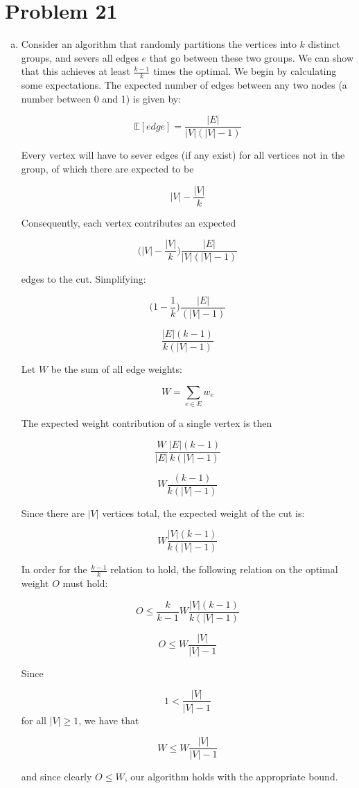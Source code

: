 \documentclass{article}[12pt]
\begin{document}
\section{Problem 21}
\begin{enumerate}[(a)]
\item Consider an algorithm that randomly partitions the vertices into $k$ distinct groups, and severs all edges $e$ that go between these two groups. We can show that this achieves at least $\frac{k-1}{k}$ times the optimal. We begin by calculating some expectations. The expected number of edges between any two nodes (a number between 0 and 1) is given by:

$$\mathds{E}[edge]=\frac{|E|}{|V|(|V|-1)}$$

Every vertex will have to sever edges (if any exist) for all vertices not in the group, of which there are expected to be 

$$|V|-\frac{|V|}{k}$$

Consequently, each vertex contributes an expected 

$$\bigg(|V|-\frac{|V|}{k}\bigg)\frac{|E|}{|V|(|V|-1)}$$

edges to the cut. Simplifying:

$$\bigg(1-\frac{1}{k}\bigg)\frac{|E|}{(|V|-1)}$$

$$\frac{|E|(k-1)}{k(|V|-1)}$$

Let $W$ be the sum of all edge weights:

$$W = \sum_{e \in E} w_e$$

The expected weight contribution of a single vertex is then

$$\frac{W}{|E|}\frac{|E|(k-1)}{k(|V|-1)}$$

$$W\frac{(k-1)}{k(|V|-1)}$$

Since there are $|V|$ vertices total, the expected weight of the cut is:

$$W\frac{|V|(k-1)}{k(|V|-1)}$$

In order for the $\frac{k-1}{k}$ relation to hold, the following relation on the optimal weight $O$ must hold:

$$O \leq \frac{k}{k-1}W\frac{|V|(k-1)}{k(|V|-1)}$$

$$O \leq W\frac{|V|}{|V|-1}$$

Since 

$$ 1 < \frac{|V|}{|V|-1}$$ for all $|V| \geq 1$, we have that 

$$W \leq W\frac{|V|}{|V|-1}$$

and since clearly $O \leq W$, our algorithm holds with the appropriate bound. 


\end{enumerate}
\end{document}
